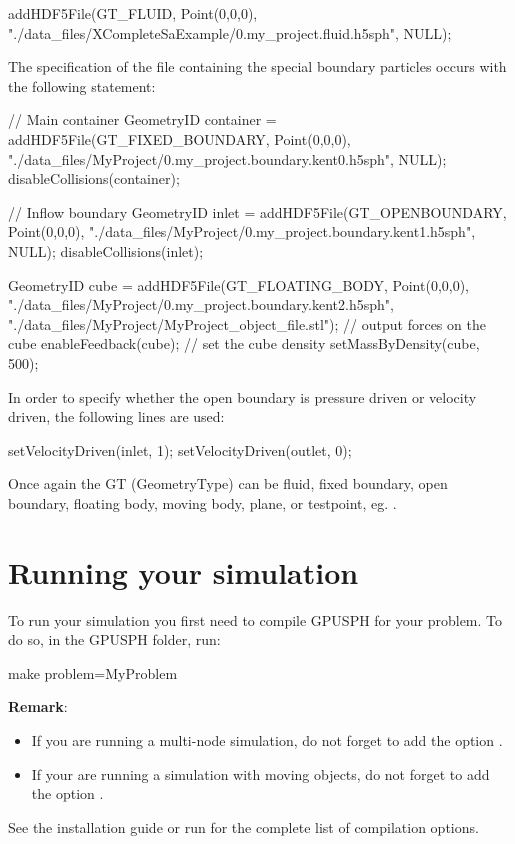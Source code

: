 \documentclass{../GPUSPHtemplate}
\begin{document}
\begin{ccode}
addHDF5File(GT_FLUID, Point(0,0,0), 
"./data_files/XCompleteSaExample/0.my_project.fluid.h5sph",
NULL);
\end{ccode}
The specification of the file containing the special boundary particles  occurs with the following statement:\\

\begin{ccode}
// Main container
GeometryID container =
addHDF5File(GT_FIXED_BOUNDARY, Point(0,0,0), 
  "./data_files/MyProject/0.my_project.boundary.kent0.h5sph",
  NULL);
disableCollisions(container);
  
// Inflow boundary 
GeometryID inlet =
  addHDF5File(GT_OPENBOUNDARY, Point(0,0,0), 
  "./data_files/MyProject/0.my_project.boundary.kent1.h5sph",
  NULL);
disableCollisions(inlet);

GeometryID cube =
  addHDF5File(GT_FLOATING_BODY, Point(0,0,0), 
  "./data_files/MyProject/0.my_project.boundary.kent2.h5sph",
  "./data_files/MyProject/MyProject_object_file.stl");
// output forces on the cube
enableFeedback(cube);
// set the cube density
setMassByDensity(cube, 500);

\end{ccode}

In order to specify whether the open boundary is pressure driven or velocity driven, the following lines
are used:
\begin{shellcode}
setVelocityDriven(inlet, 1);
setVelocityDriven(outlet, 0);
\end{shellcode}

Once again the GT (GeometryType) can be fluid, fixed boundary, open boundary, 
floating body, moving body, plane, or testpoint, eg. . 

\section{Running your simulation}\label{sec:run}
To run your simulation you first need to compile GPUSPH for your problem.
To do so, in the GPUSPH folder, run:
\begin{shellcode}
make problem=MyProblem
\end{shellcode}
\textbf{Remark}:
\begin{itemize}
\item If you are running a multi-node simulation, do not forget to add the option
.
\item If your are running a simulation with moving objects, do not forget to add the
option .
\end{itemize}
See the installation guide or run  for the complete list of compilation options.
\end{document}

